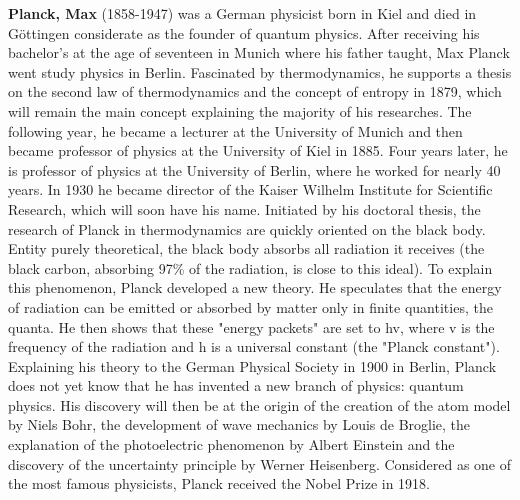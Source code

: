 \textbf{Planck, Max} (1858-1947) was a German physicist born in Kiel and died in Göttingen considerate as the founder of quantum physics. After receiving his bachelor's at the age of seventeen in Munich where his father taught, Max Planck went study physics in Berlin. Fascinated by thermodynamics, he supports a thesis on the second law of thermodynamics and the concept of entropy in 1879, which will remain the main concept explaining the majority of his researches. The following year, he became a lecturer at the University of Munich and then became professor of physics at the University of Kiel in 1885. Four years later, he is professor of physics at the University of Berlin, where he worked for nearly 40 years. In 1930 he became director of the Kaiser Wilhelm Institute for Scientific Research, which will soon have his name. Initiated by his doctoral thesis, the research of Planck in thermodynamics are quickly oriented on the black body. Entity purely theoretical, the black body absorbs all radiation it receives (the black carbon, absorbing 97\% of the radiation, is close to this ideal). To explain this phenomenon, Planck developed a new theory. He speculates that the energy of radiation can be emitted or absorbed by matter only in finite quantities, the quanta. He then shows that these "energy packets" are set to hv, where v is the frequency of the radiation and h is a universal constant (the "Planck constant"). Explaining his theory to the German Physical Society in 1900 in Berlin, Planck does not yet know that he has invented a new branch of physics: quantum physics. His discovery will then be at the origin of the creation of the atom model by Niels Bohr, the development of wave mechanics by Louis de Broglie, the explanation of the photoelectric phenomenon by Albert Einstein and the discovery of the uncertainty principle by Werner Heisenberg. Considered as one of the most famous physicists, Planck received the Nobel Prize in 1918.

